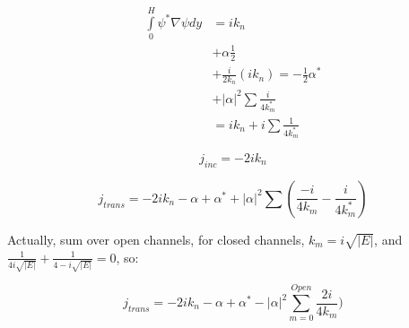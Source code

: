 \documentclass[12pt, a4paper]{article}
\begin{document}
\begin{align*}
\int\limits_{0}^H \psi^* \nabla \psi dy &=
   i k_n \\
&+ \alpha \frac{1}{2} \\
&+ \frac{i}{2 k_n} (i k_n) = -\frac{1}{2} \alpha^* \\
&+ |\alpha|^2 \sum \frac{i}{4 k_m^*} \\
&= i k_n + i \sum \frac{1}{4 k^*_m}
\end{align*}

$$j_{inc} = - 2 i k_n $$

$$j_{trans} = - 2 i k_n - \alpha + \alpha^* + |\alpha|^2 \sum (\frac{-i}{4 k_m} - \frac{i}{4 k_m^*})$$

Actually, sum over open channels, for closed channels, $k_m = i \sqrt{|E|}$, and $\frac{1}{4 i \sqrt{|E|}} + \frac{1}{4 -i \sqrt{|E|}} = 0$, so:

$$j_{trans} = -2 i k_n - \alpha + \alpha^* - |\alpha|^2 \sum_{m = 0}^{Open} \frac{2i}{4 k_m})$$
\end{document}
